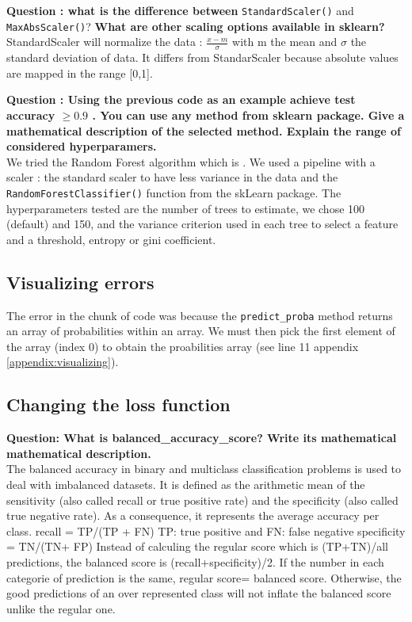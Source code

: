 \textbf{Question : what is the difference between} \verb|StandardScaler()| and \verb|MaxAbsScaler()|? \textbf{What are other scaling options available in sklearn? }\\
StandardScaler will normalize the data : $\frac{x-m}{\sigma}$ with m the mean and $\sigma$ the standard deviation of data. It differs from StandarScaler because absolute values are mapped in the range [0,1]. \\

\textbf{Question : Using the previous code as an example achieve test accuracy  $\geq0.9$ . You can use any method from sklearn package. Give a mathematical description of the selected method. Explain the range of considered hyperparamers.}\\
We tried the Random Forest algorithm which is . We used a pipeline with a scaler : the standard scaler to have less variance in the data and the \verb|RandomForestClassifier()| function from the skLearn package. The hyperparameters tested are the number of trees to estimate, we chose 100 (default) and 150,  and the variance criterion used in each tree to select a feature and a threshold, entropy or gini coefficient.


\subsection{Visualizing errors}
The error in the chunk of code was because the \verb|predict_proba| method returns an array of probabilities within an array. We must then pick the first element of the array (index 0) to obtain the proabilities array (see line 11 appendix \ref{appendix:visualizing}).\\

\subsection{Changing the loss function}
 
\textbf{Question: What is balanced\_accuracy\_score? Write its mathematical mathematical description.} \\

The balanced accuracy in binary and multiclass classification problems is used to deal with imbalanced datasets. 
It is defined as the arithmetic mean of the sensitivity (also called recall or true positive rate) and the specificity (also called true negative rate). As a consequence, it represents the average accuracy per class.
recall = TP/(TP + FN) TP: true positive and FN: false negative
specificity = TN/(TN+ FP)
Instead of calculing the regular score which is (TP+TN)/all predictions, the balanced score is (recall+specificity)/2. If the number in each categorie of prediction is the same, regular score= balanced score. Otherwise, the good predictions of an over represented class will not inflate the balanced score unlike the regular one.\\

